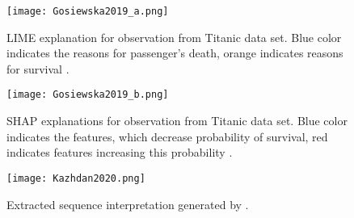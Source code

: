 \documentclass[journal]{IEEEtran}
\begin{document}
\begin{figure}
  \texttt{[image: Gosiewska2019\_a.png]}
  \caption{LIME explanation for observation from Titanic data set. Blue color indicates the reasons for passenger’s death, orange indicates reasons for survival \cite{Gosiewska2019}.}
\end{figure}

\begin{figure}
  \texttt{[image: Gosiewska2019\_b.png]}
  \caption{SHAP explanations for observation from Titanic data set. Blue color indicates the features, which decrease probability of survival, red indicates features increasing this probability \cite{Gosiewska2019}.}
\end{figure}

\begin{figure}
  \texttt{[image: Kazhdan2020.png]}
  \caption{Extracted sequence interpretation generated by \cite{Kazhdan2020}.}
\end{figure}
\end{document}
